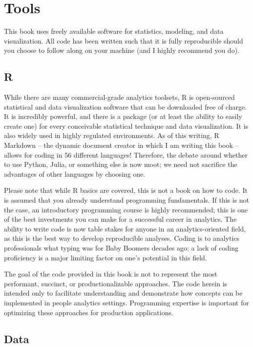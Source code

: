 \documentclass[]{book}
\begin{document}
\hypertarget{tools}{%
\section{Tools}\label{tools}}

This book uses freely available software for statistics, modeling, and data visualization. All code has been written such that it is fully reproducible should you choose to follow along on your machine (and I highly recommend you do).

\hypertarget{r}{%
\subsection{R}\label{r}}

While there are many commercial-grade analytics toolsets, R is open-sourced statistical and data visualization software that can be downloaded free of charge. It is incredibly powerful, and there is a package (or at least the ability to easily create one) for every conceivable statistical technique and data visualization. It is also widely used in highly regulated environments. As of this writing, R Markdown -- the dynamic document creator in which I am writing this book -- allows for coding in 56 different languages! Therefore, the debate around whether to use Python, Julia, or something else is now moot; we need not sacrifice the advantages of other languages by choosing one.

Please note that while R basics are covered, this is not a book on how to code. It is assumed that you already understand programming fundamentals. If this is not the case, an introductory programming course is highly recommended; this is one of the best investments you can make for a successful career in analytics. The ability to write code is now table stakes for anyone in an analytics-oriented field, as this is the best way to develop reproducible analyses. Coding is to analytics professionals what typing was for Baby Boomers decades ago; a lack of coding proficiency is a major limiting factor on one's potential in this field.

The goal of the code provided in this book is not to represent the most performant, succinct, or productionalizable approaches. The code herein is intended only to facilitate understanding and demonstrate how concepts can be implemented in people analytics settings. Programming expertise is important for optimizing these approaches for production applications.

\hypertarget{data}{%
\subsection{Data}\label{data}}
\end{document}
